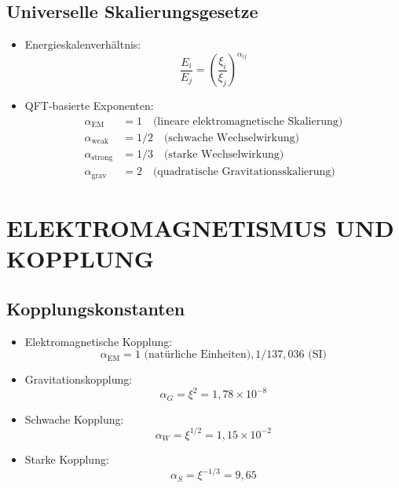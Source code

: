 	\subsection{Universelle Skalierungsgesetze}
	\begin{itemize}
		\item Energieskalenverhältnis:
		$$\frac{E_i}{E_j} = \left(\frac{\xi_i}{\xi_j}\right)^{\alpha_{ij}}$$
		
		\item QFT-basierte Exponenten:
		\begin{align*}
			\alpha_{\text{EM}} &= 1 \quad \text{(lineare elektromagnetische Skalierung)}\\
			\alpha_{\text{weak}} &= 1/2 \quad \text{(schwache Wechselwirkung)}\\
			\alpha_{\text{strong}} &= 1/3 \quad \text{(starke Wechselwirkung)}\\
			\alpha_{\text{grav}} &= 2 \quad \text{(quadratische Gravitationsskalierung)}
		\end{align*}
	\end{itemize}
	
	\section{ELEKTROMAGNETISMUS UND KOPPLUNG}
	
	\subsection{Kopplungskonstanten}
	\begin{itemize}
		\item Elektromagnetische Kopplung:
		$$\alpha_{\text{EM}} = 1 \text{ (natürliche Einheiten)}, 1/137{,}036 \text{ (SI)}$$
		
		\item Gravitationskopplung:
		$$\alpha_G = \xi^2 = 1{,}78 \times 10^{-8}$$
		
		\item Schwache Kopplung:
		$$\alpha_W = \xi^{1/2} = 1{,}15 \times 10^{-2}$$
		
		\item Starke Kopplung:
		$$\alpha_S = \xi^{-1/3} = 9{,}65$$
	\end{itemize}
	
